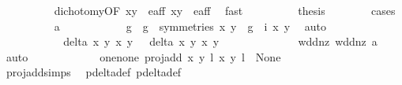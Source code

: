 \begin{isabellebody}
\ \ \ \ \ \ \ \ \isamarkupfalse%
\ dichotomy{\isacharunderscore}{}{\isacharbrackleft}OF\ {\isacartoucheopen}{\isacharparenleft}x{\isacharcomma}y{\isacharparenright}\ {\isasymin}\ e{\isacharunderscore}aff{\isacartoucheclose}\ {\isacartoucheopen}{\isacharparenleft}x{\isacharprime}{\isacharcomma}y{\isacharprime}{\isacharparenright}\ {\isasymin}\ e{\isacharunderscore}aff{\isacartoucheclose}{\isacharbrackright}\ \isamarkupfalse%
\ fast\isanewline
\ \ \ \ \ \ \isamarkupfalse%
\ \isamarkupfalse%
\ {\isacharquery}thesis\ \isanewline
\ \ \ \ \ \ \isamarkupfalse%
{\isacharparenleft}cases{\isacharparenright}\isanewline
\ \ \ \ \ \ \ \ \isamarkupfalse%
\ a\isanewline
\ \ \ \ \ \ \ \ \isamarkupfalse%
\ \isamarkupfalse%
\ g\ \ {\isachardoublequoteopen}g\ {\isasymin}\ symmetries{\isachardoublequoteclose}\ {\isachardoublequoteopen}{\isacharparenleft}x{\isacharprime}{\isacharcomma}\ y{\isacharprime}{\isacharparenright}\ {\isacharequal}\ {\isacharparenleft}g\ {\isasymcirc}\ i{\isacharparenright}\ {\isacharparenleft}x{\isacharcomma}\ y{\isacharparenright}{\isachardoublequoteclose}\ \isamarkupfalse%
\ auto\ \ \ \ \ \ \ \ \isanewline
\ \ \ \ \ \ \ \ \isamarkupfalse%
\ \isamarkupfalse%
\ {\isachardoublequoteopen}delta\ x\ y\ x{\isacharprime}\ y{\isacharprime}\ {\isacharequal}\ {}{\isachardoublequoteclose}\ {\isachardoublequoteopen}delta{\isacharprime}\ x\ y\ x{\isacharprime}\ y{\isacharprime}\ {\isacharequal}\ {}{\isachardoublequoteclose}\isanewline
\ \ \ \ \ \ \ \ \ \ \isamarkupfalse%
\ wd{\isacharunderscore}d{\isacharunderscore}nz\ wd{\isacharunderscore}d{\isacharprime}{\isacharunderscore}nz\ a\ \isamarkupfalse%
\ auto\ \isanewline
\ \ \ \ \ \ \ \ \isamarkupfalse%
\ \isamarkupfalse%
\ one{\isacharunderscore}none{\isacharcolon}\ {\isachardoublequoteopen}proj{\isacharunderscore}add\ {\isacharparenleft}{\isacharparenleft}x{\isacharcomma}\ y{\isacharparenright}{\isacharcomma}\ l{\isacharparenright}\ {\isacharparenleft}{\isacharparenleft}x{\isacharprime}{\isacharcomma}\ y{\isacharprime}{\isacharparenright}{\isacharcomma}\ l{\isacharprime}{\isacharparenright}\ {\isacharequal}\ None{\isachardoublequoteclose}\isanewline
\ \ \ \ \ \ \ \ \ \ \isamarkupfalse%
\ proj{\isacharunderscore}add{\isachardot}simps\ \isamarkupfalse%
\ p{\isacharunderscore}delta{\isacharunderscore}def\ p{\isacharunderscore}delta{\isacharprime}{\isacharunderscore}def\ \isamarkupfalse%

\end{isabellebody}
